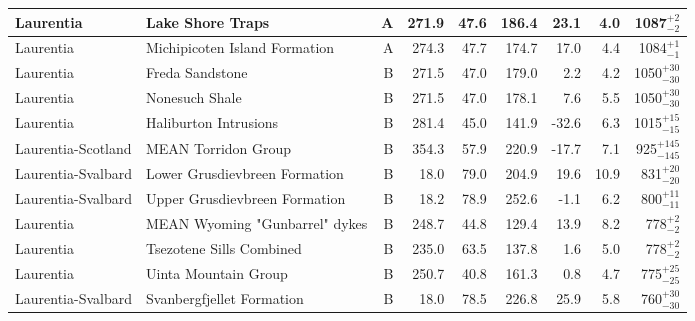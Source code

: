 \begin{longtable}{p{1 in}p{1 in}rrrrrrr}
                     Laurentia &                                   Lake Shore Traps &      A &     271.9 &      47.6 & 186.4 &  23.1 &       4.0 &     1087$^{+2}_{-2}$ \\ \hline
                     Laurentia &                      Michipicoten Island Formation &      A &     274.3 &      47.7 & 174.7 &  17.0 &       4.4 &     1084$^{+1}_{-1}$ \\ \hline
                     Laurentia &                                    Freda Sandstone &      B &     271.5 &      47.0 & 179.0 &   2.2 &       4.2 &   1050$^{+30}_{-30}$ \\ \hline
                     Laurentia &                                     Nonesuch Shale &      B &     271.5 &      47.0 & 178.1 &   7.6 &       5.5 &   1050$^{+30}_{-30}$ \\ \hline
                     Laurentia &                              Haliburton Intrusions &      B &     281.4 &      45.0 & 141.9 & -32.6 &       6.3 &   1015$^{+15}_{-15}$ \\ \hline
            Laurentia-Scotland &                                MEAN Torridon Group &      B &     354.3 &      57.9 & 220.9 & -17.7 &       7.1 &  925$^{+145}_{-145}$ \\ \hline
            Laurentia-Svalbard &                      Lower Grusdievbreen Formation &      B &      18.0 &      79.0 & 204.9 &  19.6 &      10.9 &    831$^{+20}_{-20}$ \\ \hline
            Laurentia-Svalbard &                      Upper Grusdievbreen Formation &      B &      18.2 &      78.9 & 252.6 &  -1.1 &       6.2 &    800$^{+11}_{-11}$ \\ \hline
                     Laurentia &                     MEAN Wyoming "Gunbarrel" dykes &      B &     248.7 &      44.8 & 129.4 &  13.9 &       8.2 &      778$^{+2}_{-2}$ \\ \hline
                     Laurentia &                           Tsezotene Sills Combined &      B &     235.0 &      63.5 & 137.8 &   1.6 &       5.0 &      778$^{+2}_{-2}$ \\ \hline
                     Laurentia &                               Uinta Mountain Group &      B &     250.7 &      40.8 & 161.3 &   0.8 &       4.7 &    775$^{+25}_{-25}$ \\ \hline
            Laurentia-Svalbard &                          Svanbergfjellet Formation &      B &      18.0 &      78.5 & 226.8 &  25.9 &       5.8 &    760$^{+30}_{-30}$ \\ \hline

\end{longtable}
